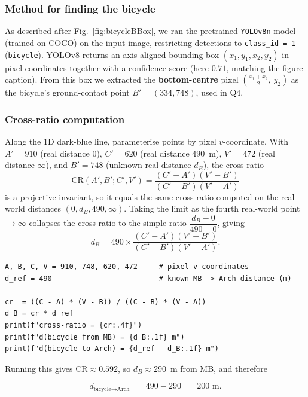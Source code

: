\documentclass[11pt]{article}
\newenvironment{studentSpace}{\itshape}{}
\begin{document}
\begin{studentSpace}

\subsubsection*{Method for finding the bicycle}

As described after Fig.~\ref{fig:bicycleBBox}, we ran the pretrained
\texttt{YOLOv8n} model (trained on COCO) on the input image, restricting
detections to \texttt{class\_id = 1} (\texttt{bicycle}). YOLOv8 returns
an axis-aligned bounding box $(x_1,y_1,x_2,y_2)$ in pixel coordinates
together with a confidence score (here $0.71$, matching the figure
caption). From this box we extracted the \textbf{bottom-centre} pixel
$\left(\frac{x_1+x_2}{2},\,y_2\right)$ as the bicycle's ground-contact
point $B' = (334,748)$, used in Q4.

\subsubsection*{Cross-ratio computation}

Along the 1D dark-blue line, parameterise points by pixel
$v$-coordinate. With $A'=910$ (real distance $0$), $C'=620$ (real
distance $490$~m), $V'=472$ (real distance $\infty$), and $B'=748$
(unknown real distance $d_B$), the cross-ratio
\[
\text{CR}(A',B';C',V') = \frac{(C'-A')(V'-B')}{(C'-B')(V'-A')}
\]
is a projective invariant, so it equals the same cross-ratio computed
on the real-world distances $(0, d_B, 490, \infty)$. Taking the limit
as the fourth real-world point $\to \infty$ collapses the cross-ratio
to the simple ratio $\dfrac{d_B - 0}{490 - 0}$, giving
\[
d_B = 490 \times \frac{(C'-A')(V'-B')}{(C'-B')(V'-A')}.
\]

\begin{lstlisting}
A, B, C, V = 910, 748, 620, 472     # pixel v-coordinates
d_ref = 490                         # known MB -> Arch distance (m)

cr  = ((C - A) * (V - B)) / ((C - B) * (V - A))
d_B = cr * d_ref
print(f"cross-ratio = {cr:.4f}")
print(f"d(bicycle from MB) = {d_B:.1f} m")
print(f"d(bicycle to Arch) = {d_ref - d_B:.1f} m")
\end{lstlisting}

Running this gives $\text{CR} \approx 0.592$, so
$d_B \approx 290$~m from MB, and therefore

\[
\boxed{d_{\text{bicycle} \to \text{Arch}} \;=\; 490 - 290 \;=\; 200 \text{ m}}.
\]


\end{studentSpace}
\end{document}
